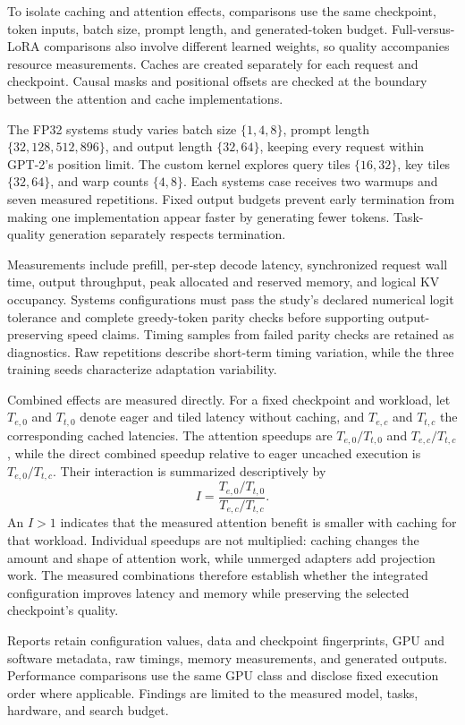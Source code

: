 To isolate caching and attention effects, comparisons use the same checkpoint, token inputs, batch size, prompt length, and generated-token budget. Full-versus-LoRA comparisons also involve different learned weights, so quality accompanies resource measurements. Caches are created separately for each request and checkpoint. Causal masks and positional offsets are checked at the boundary between the attention and cache implementations.

The FP32 systems study varies batch size $\{1,4,8\}$, prompt length $\{32,128,512,896\}$, and output length $\{32,64\}$, keeping every request within GPT-2's position limit. The custom kernel explores query tiles $\{16,32\}$, key tiles $\{32,64\}$, and warp counts $\{4,8\}$. Each systems case receives two warmups and seven measured repetitions. Fixed output budgets prevent early termination from making one implementation appear faster by generating fewer tokens. Task-quality generation separately respects termination.

Measurements include prefill, per-step decode latency, synchronized request wall time, output throughput, peak allocated and reserved memory, and logical KV occupancy. Systems configurations must pass the study's declared numerical logit tolerance and complete greedy-token parity checks before supporting output-preserving speed claims. Timing samples from failed parity checks are retained as diagnostics. Raw repetitions describe short-term timing variation, while the three training seeds characterize adaptation variability.

Combined effects are measured directly. For a fixed checkpoint and workload, let $T_{e,0}$ and $T_{t,0}$ denote eager and tiled latency without caching, and $T_{e,c}$ and $T_{t,c}$ the corresponding cached latencies. The attention speedups are $T_{e,0}/T_{t,0}$ and $T_{e,c}/T_{t,c}$, while the direct combined speedup relative to eager uncached execution is $T_{e,0}/T_{t,c}$. Their interaction is summarized descriptively by
\begin{equation}
 I=\frac{T_{e,0}/T_{t,0}}{T_{e,c}/T_{t,c}}.
\end{equation}
An $I>1$ indicates that the measured attention benefit is smaller with caching for that workload. Individual speedups are not multiplied: caching changes the amount and shape of attention work, while unmerged adapters add projection work. The measured combinations therefore establish whether the integrated configuration improves latency and memory while preserving the selected checkpoint's quality.

Reports retain configuration values, data and checkpoint fingerprints, GPU and software metadata, raw timings, memory measurements, and generated outputs. Performance comparisons use the same GPU class and disclose fixed execution order where applicable. Findings are limited to the measured model, tasks, hardware, and search budget.

